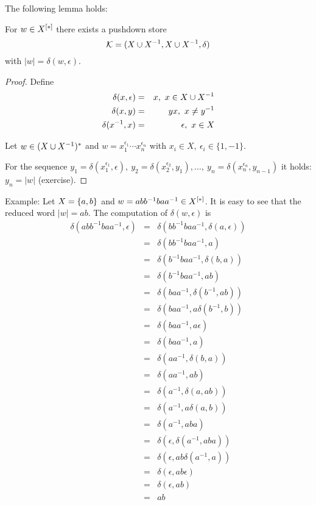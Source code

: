 The following lemma holds:
\begin{lemma}
For $w \in \mbox{${X}^{[*]}$}$ there exists a pushdown store
\[ \mbox{$\mathcal{K}$} =(X \cup {X}^{-1}, X \cup {X}^{-1}, \delta) \]
with $|w| = \delta(w, \epsilon)$.
\end{lemma}

\begin{proof}
Define
\begin{eqnarray}
\delta(x, \epsilon) & = & x,\ x\in X \cup {X}^{-1} \label{delta:1} \\
\delta(x, y) & = & yx,\ x\neq y^{-1} \label{delta:2}\\
\delta(x^{-1}, x) & = & \epsilon,\ x\in X \label{delta:3}
\end{eqnarray}

Let $w\in (X \cup {X}^{-1})^*$ and $w = x_1^{\epsilon_1} \cdots x_n^{\epsilon_n}$
with $x_i\in X,\ \epsilon_i\in \{1, -1\}$.

For the sequence $y_1 = \delta(x_1^{\epsilon_1}, \epsilon),\ y_2 =
\delta(x_2^{\epsilon_2}, y_1), \ldots,\ y_n = \delta(x_n^{\epsilon_n}, y_{n-1})$
it holds: $y_n = |w|$ (exercise).
\end{proof}


Example: Let $X=\mbox{$\{a,b\}$}$ and $w=abb^{-1}baa^{-1}\in \mbox{${X}^{[*]}$}$. It is
easy to see that the reduced word $|w|=ab$. The computation of $\delta(w,\epsilon)$ is
\begin{eqnarray*}
\delta(abb^{-1}baa^{-1}, \epsilon)
&=&\delta(bb^{-1}baa^{-1}, \delta(a,\epsilon)) \\
&=&\delta(bb^{-1}baa^{-1}, a) \\
&=&\delta(b^{-1}baa^{-1}, \delta(b, a)) \\
&=&\delta(b^{-1}baa^{-1}, ab)\\
&=&\delta(baa^{-1}, \delta(b^{-1}, ab)) \\
&=&\delta(baa^{-1}, a \delta(b^{-1}, b)) \\
&=&\delta(baa^{-1}, a \epsilon) \\
&=&\delta(baa^{-1}, a) \\
&=&\delta(aa^{-1}, \delta(b,a)) \\
&=&\delta(aa^{-1}, a b) \\
&=&\delta(a^{-1}, \delta(a,ab)) \\
&=&\delta(a^{-1}, a \delta(a,b)) \\
&=&\delta(a^{-1}, a b a) \\
&=&\delta(\epsilon, \delta(a^{-1}, aba)) \\
&=&\delta(\epsilon, a b \delta(a^{-1}, a)) \\
&=&\delta(\epsilon, a b \epsilon) \\
&=&\delta(\epsilon, a b) \\
&=&a b \\
\end{eqnarray*}

